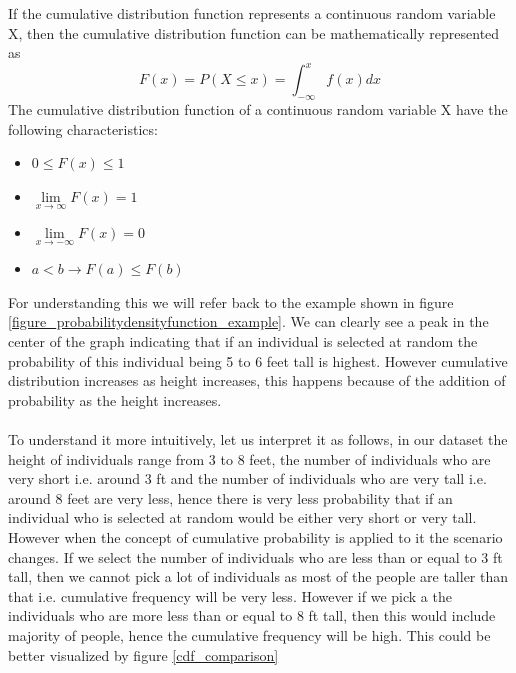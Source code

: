 \documentclass[twoside,12pt]{report}  %
\begin{document}
If the cumulative distribution function represents a continuous random variable X, then the cumulative distribution function can be mathematically represented as
$$ F(x) = P(X \le x) = \int_{-\infty}^{x}f(x)dx $$
The cumulative distribution function of a continuous random variable X have the following characteristics:
\begin{itemize}
	\item $ 0 \le F(x) \le 1$
	\item $\lim\limits_{x \rightarrow \infty}F(x) = 1$
	\item $\lim\limits_{x \rightarrow -\infty}F(x) = 0 $
	\item $a < b \rightarrow F(a) \le F(b)$
\end{itemize} 
\vfill
\pagebreak
\begin{tcolorbox}[colback=blue!5!white, colframe=blue!75!black, title = \textbf{Cumulative Distribution Function for Probability Density Distribution}]
	For understanding this we will refer back to the example shown in figure \ref{figure_probabilitydensityfunction_example}. We can clearly see a peak in the center of the graph indicating that if an individual is selected at random the probability of this individual being 5 to 6 feet tall is highest. However cumulative distribution increases as height increases, this happens because of the addition of probability as the height increases.
	\\
	\\
	To understand it more intuitively, let us interpret it as follows, in our dataset the height of individuals range from 3 to 8 feet, the number of individuals who are very short i.e. around 3 ft and the number of individuals who are very tall i.e. around 8 feet are very less, hence there is very less probability that if an individual who is selected at random would be either very short or very tall. However when the concept of cumulative probability is applied to it the scenario changes. If we select the number of individuals who are less than or equal to 3 ft tall, then we cannot pick a lot of individuals as most of the people are taller than that i.e. cumulative frequency will be very less. However if we pick a the individuals who are more less than or equal to 8 ft tall, then this would include majority of people, hence the cumulative frequency will be high. This could be better visualized by figure \ref{cdf_comparison}   
	\begin{figure}[H]
		\centering
			\begin{subfigure}[b]{0.3\textwidth}

\end{subfigure}
\end{figure}
\end{tcolorbox}
\end{document}
